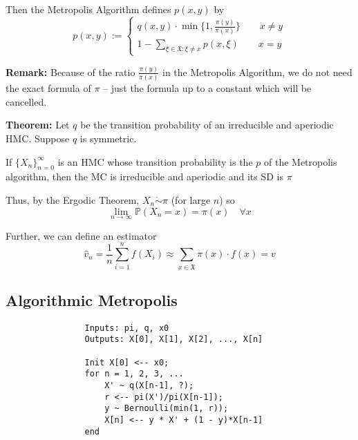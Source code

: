 \documentclass[12pt]{article}
\renewcommand{\hat}[1]{\widehat{#1}}
\renewcommand{\P}{\mathbb{P}}
\newcommand{\mfX}{\mathfrak{X}}
\begin{document}
        Then the Metropolis Algorithm defines $p(x, y)$ by 
        \[p(x, y) := \begin{cases}
            q(x, y) \cdot \min\{1, \frac{\pi(y)}{\pi(x)}\} \qquad x \neq y\\
            1 - \sum_{\xi \in \mfX: \xi \neq x} p(x, \xi) \qquad x = y
        \end{cases}\]

        \textbf{Remark:} Because of the ratio $\frac{\pi(y)}{\pi(x)}$ in the Metropolis Algorithm, we do not need the exact formula of $\pi$ -- just the formula up to a constant which will be cancelled. 

        \textbf{Theorem:} Let $q$ be the transition probability of an irreducible and aperiodic HMC. Suppose $q$ is symmetric. 

        If $\{X_n\}_{n=0}^\infty$ is an HMC whose transition probability is the $p$ of the Metropolis algorithm, then the MC is irreducible and aperiodic and its SD is $\pi$

        Thus, by the Ergodic Theorem, $X_n \dot\sim \pi$ (for large $n$) so 
        \[\lim_{n\to \infty} \P(X_n = x) = \pi(x) \quad \forall x\]

        Further, we can define an estimator 
        \[\hat v_n = \frac{1}{n}\sum_{i=1}^n f(X_i) \approx \sum_{x\in \mfX} \pi(x) \cdot f(x) = v\]

        \subsection{Algorithmic Metropolis}
            \begin{verbatim}
                Inputs: pi, q, x0
                Outputs: X[0], X[1], X[2], ..., X[n]

                Init X[0] <-- x0;
                for n = 1, 2, 3, ...
                    X' ~ q(X[n-1], ?);
                    r <-- pi(X')/pi(X[n-1]);
                    y ~ Bernoulli(min(1, r));
                    X[n] <-- y * X' + (1 - y)*X[n-1]
                end 
            \end{verbatim}
\end{document}
